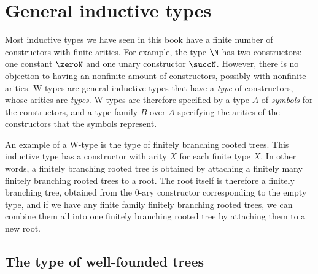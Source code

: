 \section{General inductive types}\label{sec:w-types}


Most inductive types we have seen in this book have a finite number of constructors with finite arities. For example, the type $\N$ has two constructors: one constant $\zeroN$ and one unary constructor $\succN$. However, there is no objection to having an nonfinite amount of constructors, possibly with nonfinite arities. W-types are general inductive types that have a \emph{type} of constructors, whose arities are \emph{types}. W-types are therefore specified by a type $A$ of \emph{symbols} for the constructors, and a type family $B$ over $A$ specifying the arities of the constructors that the symbols represent.

An example of a W-type is the type of finitely branching rooted trees. This inductive type has a constructor with arity $X$ for each finite type $X$. In other words, a finitely branching rooted tree is obtained by attaching a finitely many finitely branching rooted trees to a root. The root itself is therefore a finitely branching tree, obtained from the $0$-ary constructor corresponding to the empty type, and if we have any finite family finitely branching rooted trees, we can combine them all into one finitely branching rooted tree by attaching them to a new root.

\subsection{The type of well-founded trees}

